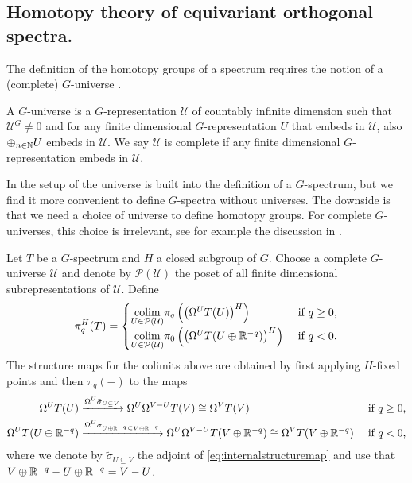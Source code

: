 \subsection{Homotopy theory of equivariant orthogonal spectra.}
The definition of the homotopy groups of a spectrum requires the notion of a 
(complete) $G$-universe \cite[Definition~II.2.2, \pno~30]{mandellmay}.
\begin{mydef}
A $G$-universe is a $G$-representation $\mathcal{U}$ of countably infinite dimension
such that $\mathcal{U}^G \neq 0$ and for any finite dimensional $G$-representation
$U$ that embeds in $\mathcal{U}$, also $\oplus_{n\in \mathbb{N}}U$ embeds in $\mathcal{U}$. 
We say $\mathcal{U}$ is complete if
any finite dimensional $G$-representation embeds in $\mathcal{U}$.
\end{mydef}
In the setup of \cite{mandellmay} the universe is built into the definition
of a $G$-spectrum, but we find it more convenient to define $G$-spectra
without universes. The downside is that we need a choice of universe
to define homotopy groups. For complete $G$-universes, this choice is
irrelevant, see for example the discussion in \cite[\pno~1510-1511]{rvadams}.
\begin{mydef}
Let $T$ be a $G$-spectrum and $H$ a closed subgroup of $G$. Choose
a complete $G$-universe $\mathcal{U}$ and denote by $\mathcal{P}(\mathcal{U})$
the poset of all finite dimensional subrepresentations of $\mathcal{U}$. Define
\begin{equation}\label{eq:equivarianthomotopygroup}
\pi_q^H(T) = 
\begin{cases}
\underset{U\in \mathcal{P}(\mathcal{U})}{\mathrm{colim}} \pi_q\left(\left(\Omega^UT(U)\right)^H\right) &\text{ if } q\ge 0,\\
\underset{U\in \mathcal{P}(\mathcal{U})}{\mathrm{colim}} \pi_{0}\left(\left(\Omega^UT(U\oplus \mathbb{R}^{-q})\right)^H\right) &\text{ if } q< 0.
\end{cases}
\end{equation}
The structure maps for the colimits above are obtained by first applying $H$-fixed points and then $\pi_q(-)$
to the maps
\begin{align}
\Omega^UT(U)&\xrightarrow{\Omega^U \tilde \sigma_{U\subseteq V}} \Omega^U\Omega^{V-U} T(V)\cong \Omega^{V} T(V)
&\text{ if } q\ge 0,\label{eq:homotopygroupstructuremap1}\\
\Omega^UT(U\oplus \mathbb{R}^{-q})&\xrightarrow{\Omega^U \tilde \sigma_{U\oplus \mathbb{R}^{-q}\subseteq V\oplus \mathbb{R}^{-q}}} 
\Omega^U\Omega^{V-U} T(V\oplus \mathbb{R}^{-q})\cong \Omega^{V} T(V\oplus \mathbb{R}^{-q})
&\text{ if } q<0 \label{eq:homotopygroupstructuremap2},
\end{align}
where we denote by $\tilde \sigma_{U\subseteq V}$  the adjoint of \eqref{eq:internalstructuremap}
and use that $V\oplus \mathbb{R}^{-q}-U\oplus \mathbb{R}^{-q} = V-U$.
\end{mydef}

